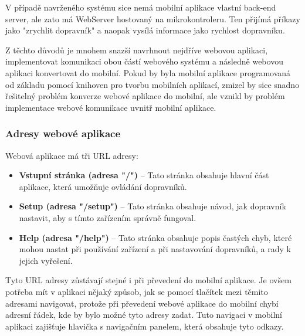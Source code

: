 V případě navrženého systému sice nemá mobilní aplikace vlastní back-end server, ale zato má WebServer hostovaný na mikrokontroleru. Ten přijímá příkazy jako "zrychlit dopravník" a naopak vysílá informace jako rychlost dopravníku.

Z těchto důvodů je mnohem snazší navrhnout nejdříve webovou aplikaci, implementovat komunikaci obou částí webového systému a následně webovou aplikaci konvertovat do mobilní. Pokud by byla mobilní aplikace programovaná od základu pomocí knihoven pro tvorbu mobilních aplikací, zmizel by sice snadno řešitelný problém konverze webové aplikace do mobilní, ale vznikl by problém implementace webové komunikace uvnitř mobilní aplikace.

\subsubsection{Adresy webové aplikace}\label{sec:AdresyWeboveAplikace}

Webová aplikace má tři URL adresy:
\begin{itemize}
	\item \textbf{Vstupní stránka (adresa "/")} – Tato stránka obsahuje hlavní část aplikace, která umožňuje ovládání dopravníků.
	\item \textbf{Setup (adresa "/setup")} – Tato stránka obsahuje návod, jak dopravník nastavit, aby s tímto zařízením správně fungoval.
	\item \textbf{Help (adresa "/help")} – Tato stránka obsahuje popis častých chyb, které mohou nastat při používání zařízení a při nastavování dopravníků, a rady k jejich vyřešení.
\end{itemize}

Tyto URL adresy zůstávají stejné i při převedení do mobilní aplikace. Je ovšem potřeba mít v aplikaci nějaký způsob, jak se pomocí tlačítek mezi těmito adresami navigovat, protože při převedení webové aplikace do mobilní chybí adresní řádek, kde by bylo možné tyto adresy zadat. Tuto navigaci v mobilní aplikaci zajišťuje hlavička s navigačním panelem, která obsahuje tyto odkazy.


